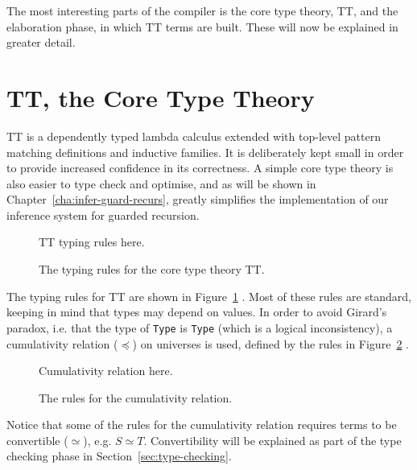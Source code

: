 
The most interesting parts of the compiler is the core type theory, TT, and the
elaboration phase, in which TT terms are built. These will now be explained in
greater detail.

\section{TT, the Core Type Theory}
TT is a dependently typed lambda calculus extended with top-level pattern
matching definitions and inductive families. It is deliberately kept small in order to provide increased
confidence in its correctness. A simple core type theory is also easier to
type check and optimise, and as will be shown in
Chapter~\ref{cha:infer-guard-recurs}, greatly simplifies the implementation of
our inference system for guarded recursion.
\begin{figure}
TT typing rules here.
\caption{The typing rules for the core type theory TT.}
\label{fig:TT_typing_rules}
\end{figure}
The typing rules for TT are shown in Figure~\ref{fig:TT_typing_rules} . Most of these rules are standard, keeping in mind that types may
depend on values. In order to avoid Girard's paradox, i.e. that the type of
\texttt{Type} is \texttt{Type} (which is a logical inconsistency), a
cumulativity relation ($\preceq$) on universes is used, defined by the rules in
Figure~\ref{fig:TT_cumulativity_relation} .
\begin{figure}
Cumulativity relation here.
\caption{The rules for the cumulativity relation.}
\label{fig:TT_cumulativity_relation}
\end{figure}
Notice that some of the rules for the cumulativity relation requires terms to be
convertible ($\simeq$), e.g. $S\simeq T$. Convertibility will be explained as
part of the type checking phase in Section~\ref{sec:type-checking}.

